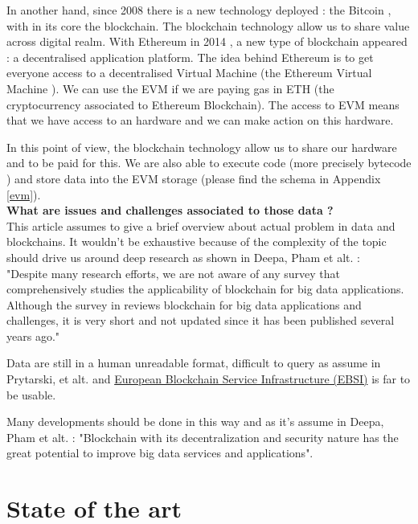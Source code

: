 \documentclass[12pt]{article}
\begin{document}
In another hand, since 2008 there is a new technology deployed : the Bitcoin \cite{whitepaper-btc}, with in its core the blockchain. The blockchain technology allow us to share value across digital realm. With Ethereum in 2014 \cite{whitepaper-eth}, a new type of blockchain appeared : a decentralised application platform. 
The idea behind Ethereum is to get everyone access to a decentralised Virtual Machine (the Ethereum Virtual Machine \cite{kevm}). We can use the EVM if we are paying gas \cite{gas-eth} in ETH (the cryptocurrency associated to Ethereum Blockchain). 
The access to EVM means that we have access to an hardware and we can make action on this hardware.  

In this point of view, the blockchain technology allow us to share our hardware and to be paid for this. We are also able to execute code (more precisely bytecode \cite{bytecode-evm}) and store data into the EVM storage (please find the schema in Appendix \ref{evm}).\\

{\bf What are issues and challenges associated to those data ?} \\

This article assumes to give a brief overview about actual problem in data and blockchains. It wouldn't be exhaustive because of the complexity of the topic should drive us around deep research as shown in Deepa, Pham et alt. \cite{survey-bigdata-blockchain} : \\
"Despite many research efforts, we are not aware of any survey that comprehensively studies the applicability of blockchain for big data applications. Although the survey in \cite{scalability-blockchain} reviews blockchain for big data applications and challenges, it is very short and not updated since it has been published several years ago."

Data are still in a human unreadable format, difficult to query as assume in Prytarski, et alt. \cite{query} and \href{https://ec.europa.eu/digital-building-blocks/code/projects/EBSI}{European Blockchain Service Infrastructure (EBSI)} is far to be usable. 

Many developments should be done in this way and as it's assume in Deepa, Pham et alt. \cite{survey-bigdata-blockchain} : "Blockchain with its decentralization and security nature has the great potential to improve big data services and applications".



\section{State of the art}
\end{document}
